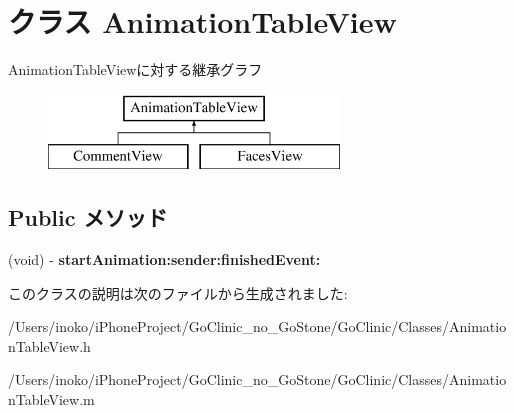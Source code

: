\hypertarget{interface_animation_table_view}{
\section{クラス AnimationTableView}
\label{interface_animation_table_view}
}
AnimationTableViewに対する継承グラフ\begin{figure}[H]
\begin{center}
\leavevmode
\includegraphics[height=2.000000cm]{interface_animation_table_view}
\end{center}
\end{figure}
\subsection*{Public メソッド}
\begin{DoxyCompactItemize}
\item 
\hypertarget{interface_animation_table_view_a86e0b1d9d7f4169e19d2fa24f10ef599}{
(void) -\/ {\bfseries startAnimation:sender:finishedEvent:}}
\label{interface_animation_table_view_a86e0b1d9d7f4169e19d2fa24f10ef599}

\end{DoxyCompactItemize}


このクラスの説明は次のファイルから生成されました:\begin{DoxyCompactItemize}
\item 
/Users/inoko/iPhoneProject/GoClinic\_\-no\_\-GoStone/GoClinic/Classes/AnimationTableView.h\item 
/Users/inoko/iPhoneProject/GoClinic\_\-no\_\-GoStone/GoClinic/Classes/AnimationTableView.m\end{DoxyCompactItemize}
